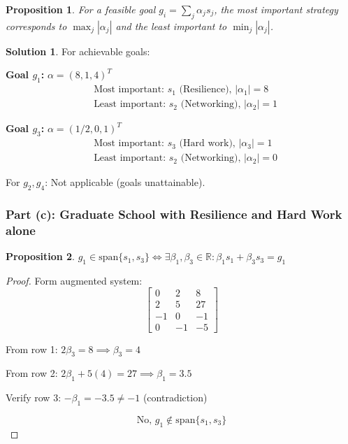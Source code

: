 \documentclass[12pt]{article}
\newtheorem{proposition}{Proposition}
\theoremstyle{definition}
\newtheorem{solution}{Solution}
\begin{document}
\begin{proposition}
For a feasible goal $g_i = \sum_{j} \alpha_j s_j$, the most important strategy corresponds to $\max_j |\alpha_j|$ and the least important to $\min_j |\alpha_j|$.
\end{proposition}

\begin{solution}
For achievable goals:

\textbf{Goal $g_1$:} $\alpha = (8, 1, 4)^T$
\begin{align*}
&\text{Most important: } s_1 \text{ (Resilience), } |\alpha_1| = 8 \\
&\text{Least important: } s_2 \text{ (Networking), } |\alpha_2| = 1
\end{align*}

\textbf{Goal $g_3$:} $\alpha = (1/2, 0, 1)^T$
\begin{align*}
&\text{Most important: } s_3 \text{ (Hard work), } |\alpha_3| = 1 \\
&\text{Least important: } s_2 \text{ (Networking), } |\alpha_2| = 0
\end{align*}

For $g_2, g_4$: Not applicable (goals unattainable).
\end{solution}

\subsubsection*{Part (c): Graduate School with Resilience and Hard Work alone}

\begin{proposition}
$g_1 \in \text{span}\{s_1, s_3\} \iff \exists \beta_1, \beta_3 \in \mathbb{R}: \beta_1 s_1 + \beta_3 s_3 = g_1$
\end{proposition}

\begin{proof}
Form augmented system:
\[
\left[\begin{array}{cc|c}
0 & 2 & 8 \\
2 & 5 & 27 \\
-1 & 0 & -1 \\
0 & -1 & -5
\end{array}\right]
\]

From row 1: $2\beta_3 = 8 \implies \beta_3 = 4$

From row 2: $2\beta_1 + 5(4) = 27 \implies \beta_1 = 3.5$

Verify row 3: $-\beta_1 = -3.5 \neq -1$ (contradiction)

\[
\boxed{\text{No, } g_1 \notin \text{span}\{s_1, s_3\}}
\]
\end{proof}
\end{document}

